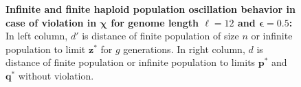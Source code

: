 \begin{figure}[h]
\begin{center}
\hspace{-3em}%
\vspace{-0.5em} \hspace{-3em}%


\caption{\textbf{Infinite and finite haploid population oscillation behavior in case of violation in $\bm{\chi}$ for genome length $\ell = 12$ and $\bm{\epsilon} = 0.5$:} 
  In left column, $d'$ is distance of finite population of size $n$ or infinite population to limit $\bm{z}^\ast$ for $g$ generations. In right column, $d$ is distance of finite population or infinite population to limits $\bm{p}^\ast$ and $\bm{q}^\ast$ without violation.}
\label{oscillation_12h_vio_chi_0.5}
\end{center}
\end{figure}

